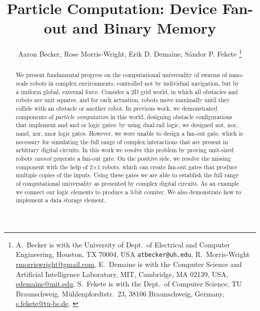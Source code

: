 \documentclass[letterpaper, 10 pt, conference]{ieeeconf}
\begin{document}


\title{\LARGE \bf 
Particle Computation:  Device Fan-out and Binary Memory 
}
\author{Aaron Becker,
Rose Morris-Wright,
Erik D. Demaine,
S\'andor P. Fekete
\thanks{{A.~Becker is with the University of  Dept.~of Electrical and Computer Engineering, Houston, TX 70004, USA {\tt\small atbecker@uh.edu}, 
R.~Morris-Wright  \protect\url{rmorriswright@gmail.com},
E.~Demaine is with the Computer Science and Artificial Intelligence Laboratory, MIT, Cambridge, MA 02139, USA,      \protect\url{edemaine@mit.edu},
S.~Fekete is with the Dept.~of Computer Science, TU Braunschweig,  M\"uhlenpfordtstr.~23, 38106 Braunschweig, Germany,
      \protect\url{s.fekete@tu-bs.de}.
}
} %
} %
\maketitle



\begin{abstract} 
We present fundamental progress on the computational universality of swarms of nano-scale robots
in complex environments, controlled not by individual navigation, but by a uniform global, external force.
Consider a 2D grid world, in which all obstacles and robots are unit squares,
and for each actuation, robots move maximally until they collide with an
obstacle or another robot. In previous work, we demonstrated components of \emph{particle computation} in this
world, designing obstacle configurations that implement {\sc and} and {\sc or}
logic gates:  by using dual-rail logic, we designed {\sc not, nor, nand, xor,
xnor} logic gates. However, we were unable to design a {\sc fan-out} gate, which
is necessary for simulating the full range of complex interactions
that are present in arbitrary digital circuits. In this work we resolve this 
problem by proving unit-sized robots {\em cannot} generate a {\sc fan-out} gate.  
On the positive side, we resolve the missing component with the help of 
2$\times$1 robots, which can create fan-out gates that produce multiple copies
of the inputs.  Using these gates we are able to establish the full range
of computational universality as presented by complex digital circuits.  As
an example we connect our logic elements to produce a 3-bit counter.  We also
demonstrate how to implement a data storage element.
\end{abstract}
\end{document}
